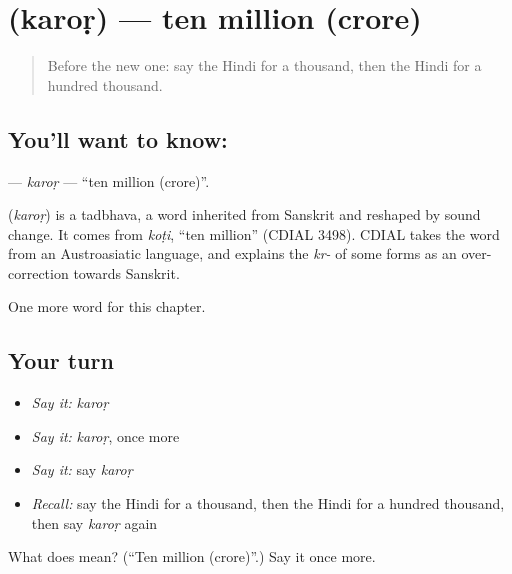 \section[\texorpdfstring{\hi{करोड़} (karoṛ)}{करोड़ (karoṛ)}]{ (karoṛ) — ten million (crore)}

\label{lesson:HI-C244-karor}



\begin{quote}
Before the new one: say the Hindi for a thousand, then the Hindi for a hundred thousand.
\end{quote}

\subsection*{You'll want to know: }
\textbf{} — \emph{karoṛ} — \textquotedblleft{}ten million (crore)\textquotedblright{}.

\begin{cousinweb}
\textbf{} (\emph{karoṛ}) is a tadbhava, a word inherited from Sanskrit and reshaped by sound change. It comes from \emph{koṭi}, \textquotedblleft{}ten million\textquotedblright{} (CDIAL 3498). CDIAL takes the word from an Austroasiatic language, and explains the \emph{kr-} of some forms as an over-correction towards Sanskrit.
\end{cousinweb}

\begin{grammarlens}[title={What you've built}]
One more word for this chapter.
\end{grammarlens}

\subsection*{Your turn}
\begin{itemize}
\raggedright
  \item \emph{Say it:} \emph{karoṛ}
  \item \emph{Say it:} \emph{karoṛ}, once more
  \item \emph{Say it:} say \emph{karoṛ}
  \item \emph{Recall:} say the Hindi for a thousand, then the Hindi for a hundred thousand, then say \emph{karoṛ} again
\end{itemize}

\begin{tcolorbox}[breakable,colback=teal!4,colframe=teal!35!black,title={Before you move on}]
What does  mean? (\textquotedblleft{}Ten million (crore)\textquotedblright{}.) Say it once more.
\end{tcolorbox}
